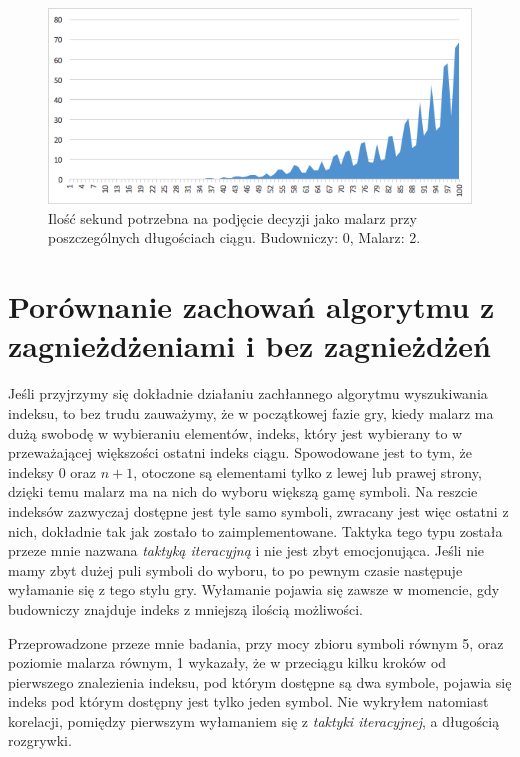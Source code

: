 \documentclass[document]{xmgr}
\begin{document}
\begin{figure}[h]
    \centering
    \includegraphics[scale = 0.7]{images/timePainter2Builder0}
    \caption{Ilość sekund potrzebna na podjęcie decyzji jako malarz przy poszczególnych długościach ciągu. Budowniczy: 0, Malarz: 2.}
    \label{fig:painter2builder0}
\end{figure}


\section{Porównanie zachowań algorytmu z zagnieżdżeniami i bez zagnieżdżeń}
Jeśli przyjrzymy się dokładnie działaniu zachłannego algorytmu wyszukiwania indeksu, to bez trudu zauważymy, że w początkowej fazie gry, kiedy malarz ma dużą swobodę w wybieraniu elementów, indeks, który jest wybierany to w przeważającej większości ostatni indeks ciągu. Spowodowane jest to tym, że indeksy $0$ oraz $n+1$, otoczone są elementami tylko z lewej lub prawej strony, dzięki temu malarz ma na nich do wyboru większą gamę symboli. Na reszcie indeksów zazwyczaj dostępne jest tyle samo symboli, zwracany jest więc ostatni z nich, dokładnie tak jak zostało to zaimplementowane. Taktyka tego typu została przeze mnie nazwana \textit{taktyką iteracyjną} i nie jest zbyt emocjonująca. Jeśli nie mamy zbyt dużej puli symboli do wyboru, to po pewnym czasie następuje wyłamanie się z tego stylu gry. Wyłamanie pojawia się zawsze w momencie, gdy budowniczy znajduje indeks z mniejszą ilością możliwości. 

Przeprowadzone przeze mnie badania, przy mocy zbioru symboli równym 5, oraz poziomie malarza równym, 1 wykazały, że w przeciągu kilku kroków od pierwszego znalezienia indeksu, pod którym dostępne są dwa symbole, pojawia się indeks pod którym dostępny jest tylko jeden symbol. Nie wykryłem natomiast korelacji, pomiędzy pierwszym wyłamaniem się z \textit{taktyki iteracyjnej}, a długością rozgrywki. 
 
\end{document}
